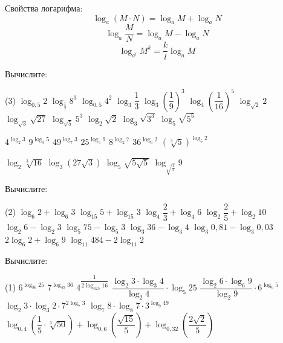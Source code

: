 \begin{class}[number=2]
	\begin{definit}
		Свойства логарифма:
		\[ \log_a(M \cdot N) = \log_a M + \log_a N \]
		\[ \log_a \dfrac{M}{N} = \log_a M - \log_a N \]
		\[ \log_{a^l} M^k=\dfrac{k}{l}\log_a M \]
	\end{definit}
	\begin{listofex}
		\item Вычислите:
		\begin{tasks}(3)
			\task \( \log_{0,5}2 \)
			\task \( \log_{\frac{1}{2}}8^3 \)
			\task \( \log_{0,5}4^2 \)
			\task \( \log_3 \dfrac{1}{3} \)
			\task \( \log_3 \left(  \dfrac{1}{9} \right)^3 \)
			\task \( \log_4 \left(  \dfrac{1}{16} \right)^5 \)
			\task \( \log_{\sqrt{2}}2 \)
			\task \( \log_{\sqrt{3}}\sqrt{27} \)
			\task \( \log_{\sqrt{5}}5^3 \)
			\task \( \log_2 \sqrt{2} \)
			\task \( \log_3 \sqrt{3^3} \)
			\task \( \log_5 \sqrt{5^5} \)
			
			\task \( 4^{\log_2 3} \)
			\task \( 9^{\log_3 5} \)
			\task \( 49^{\log_7 3} \)
			\task \( 25^{\log_5 9} \)
			\task \( 8^{\log_2 7} \)
			\task \( 36^{\log_6 2} \)
			\task \( (\sqrt[3]{5})^{\log_5 2} \)
			
			\task \( \log_2 \sqrt[3]{16} \)
			\task \( \log_3 (27\sqrt{3}) \)
			\task \( \log_5 \sqrt{5\sqrt{5}} \)
			\task \( \log_{\sqrt{\frac{1}{3}}}9 \)
		\end{tasks}
		\item Вычислите:
		\begin{tasks}(2)
			\task \( \log_6 2 + \log_6 3 \)
			\task \( \log_{15} 5 + \log_{15} 3 \)
			\task \( \log_4 \dfrac{2}{3} + \log_4 6 \)
			\task \( \log_2 \dfrac{2}{5} + \log_2 10 \)
			\task \( \log_2 6 - \log_2 3 \)
			\task \( \log_5 75 - \log_5 3 \)
			\task \( \log_3 36 - \log_3 4 \)
			\task \( \log_3 0,81 - \log_3 0,03 \)
			\task \( 2\log_6 2 + \log_6 9 \)
			\task \( \log_{11} 484 - 2 \log_{11} 2 \)
		\end{tasks}
		\item Вычислите: %
		\begin{tasks}(1)
			\task \( 6^{\log_{36} 25} \)
			\task \( 7^{\log_{49} 36} \)
			\task \( 4^{\dfrac{1}{2\log_{625} 16 }} \)
			\task \( \dfrac{\log_2 3 \cdot \log_3 4}{\log_2 4} \cdot \log_5 25 \)
			\task \( \dfrac{\log_2 6 \cdot \log_6 9}{\log_2 9} \cdot 6^{\log_6 5} \)
			\task \( \log_2 3 \cdot \log_3 2 \cdot 7^{2\log_7 3} \)
			\task \( \log_7 8 \cdot \log_8 7 \cdot 3^{\log_9 49} \)
			\task \( \log_{0,4} \left( \dfrac{1}{5} \cdot \sqrt[3]{50} \right) + \log_{0,6} \left( \dfrac{\sqrt{15}}{5} \right) + \log_{0,32} \left( \dfrac{2\sqrt{2}}{5} \right)  \)
		\end{tasks}
	\end{listofex}
\end{class}

